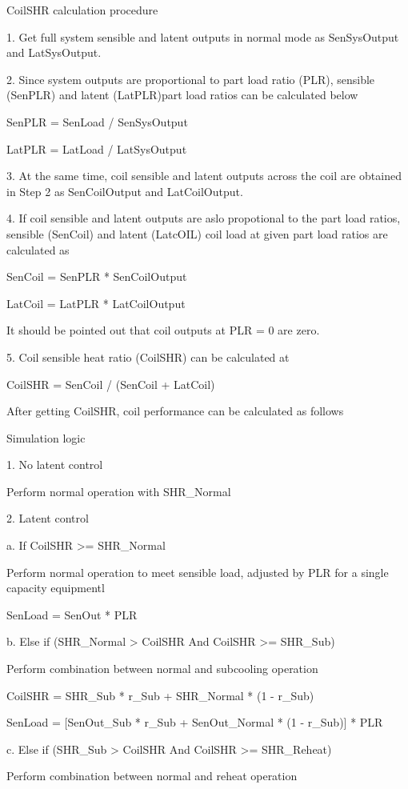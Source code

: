 CoilSHR calculation procedure

1. Get full system sensible and latent outputs in normal mode as SenSysOutput and LatSysOutput.

2. Since system outputs are proportional to part load ratio (PLR), sensible (SenPLR) and latent (LatPLR)part load ratios can be calculated below

	SenPLR = SenLoad / SenSysOutput

	LatPLR = LatLoad / LatSysOutput

3. At the same time, coil sensible and latent outputs across the coil are obtained in Step 2 as SenCoilOutput and LatCoilOutput.

4. If coil sensible and latent outputs are aslo propotional to the part load ratios, sensible (SenCoil) and latent (LatcOIL) coil load at given part load ratios are calculated as

	SenCoil = SenPLR * SenCoilOutput

	LatCoil = LatPLR * LatCoilOutput

It should be pointed out that coil outputs at PLR = 0 are zero.

5. Coil sensible heat ratio (CoilSHR) can be calculated at

	CoilSHR = SenCoil / (SenCoil + LatCoil)

After getting CoilSHR, coil performance can be calculated as follows

Simulation logic

1. No latent control

   Perform normal operation with SHR_{Normal}

2. Latent control

a.  If CoilSHR >= SHR_{Normal}

   Perform normal operation to meet sensible load, adjusted by PLR for a single capacity equipmentl

	SenLoad = SenOut * PLR

b.  Else if (SHR_{Normal} > CoilSHR And CoilSHR >= SHR_{Sub})

   Perform combination between normal and subcooling operation

	CoilSHR = SHR_{Sub} * r_{Sub} + SHR_{Normal} * (1 - r_{Sub})

	SenLoad = [SenOut_{Sub} * r_{Sub} + SenOut_{Normal} * (1 - r_{Sub})] * PLR

c.  Else if (SHR_{Sub} > CoilSHR And CoilSHR >= SHR_{Reheat})

   Perform combination between normal and reheat operation

